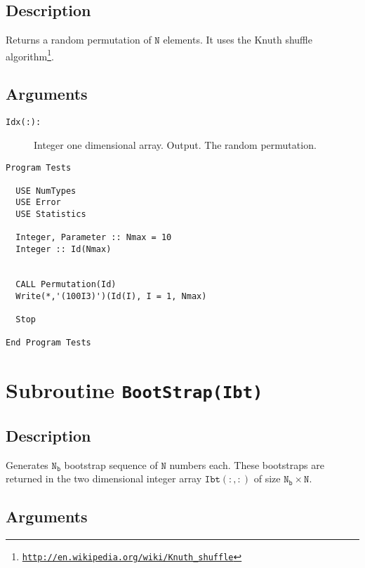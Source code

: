 \subsection{Description}

Returns a random permutation of $\mathtt{N}$ elements. It uses the
Knuth shuffle algorithm\footnote{\href{http://en.wikipedia.org/wiki/Knuth_shuffle}{\texttt{http://en.wikipedia.org/wiki/Knuth\_shuffle}}}.

\subsection{Arguments}

\begin{description}
\item[\texttt{Idx(:): }] Integer  one dimensional array. Output. The
  random permutation.
\end{description}

\begin{lstlisting}[emph=Permutation,
                   emphstyle=\color{blue},
                   frame=trBL,
                   caption=Obtaining a permutation.,
                   label=Permutation]
Program Tests

  USE NumTypes
  USE Error
  USE Statistics

  Integer, Parameter :: Nmax = 10
  Integer :: Id(Nmax)


  CALL Permutation(Id)
  Write(*,'(100I3)')(Id(I), I = 1, Nmax)

  Stop

End Program Tests
\end{lstlisting}


\section{Subroutine \texttt{BootStrap(Ibt)}}

\subsection{Description}

Generates $\mathtt{N_b}$ bootstrap sequence of $\mathtt{N}$ numbers
each. These bootstraps are returned in the two dimensional integer
array $\mathtt{Ibt(:,:)}$ of size $\mathtt{N_b\times N}$.

\subsection{Arguments}

